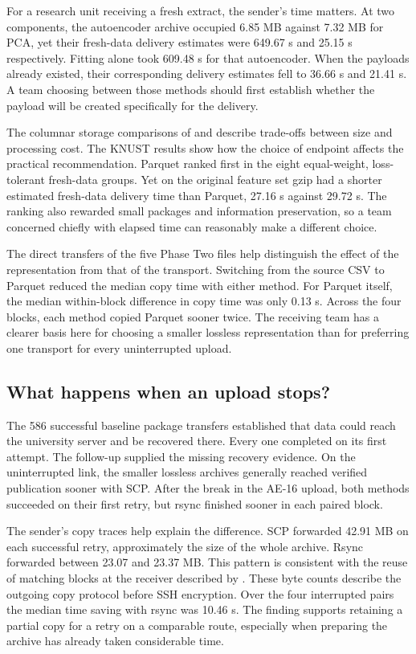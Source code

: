 For a research unit receiving a fresh extract, the sender's time matters. At two components, the autoencoder archive occupied 6.85 MB against 7.32 MB for PCA, yet their fresh-data delivery estimates were 649.67 s and 25.15 s respectively. Fitting alone took 609.48 s for that autoencoder. When the payloads already existed, their corresponding delivery estimates fell to 36.66 s and 21.41 s. A team choosing between those methods should first establish whether the payload will be created specifically for the delivery.

The columnar storage comparisons of \citet{Zeng2023} and \citet{Liu2025} describe trade-offs between size and processing cost. The KNUST results show how the choice of endpoint affects the practical recommendation. Parquet ranked first in the eight equal-weight, loss-tolerant fresh-data groups. Yet on the original feature set gzip had a shorter estimated fresh-data delivery time than Parquet, 27.16 s against 29.72 s. The ranking also rewarded small packages and information preservation, so a team concerned chiefly with elapsed time can reasonably make a different choice.

The direct transfers of the five Phase Two files help distinguish the effect of the representation from that of the transport. Switching from the source CSV to Parquet reduced the median copy time with either method. For Parquet itself, the median within-block difference in copy time was only 0.13 s. Across the four blocks, each method copied Parquet sooner twice. The receiving team has a clearer basis here for choosing a smaller lossless representation than for preferring one transport for every uninterrupted upload.

\subsection{What happens when an upload stops?}
The 586 successful baseline package transfers established that data could reach the university server and be recovered there. Every one completed on its first attempt. The follow-up supplied the missing recovery evidence. On the uninterrupted link, the smaller lossless archives generally reached verified publication sooner with SCP. After the break in the AE-16 upload, both methods succeeded on their first retry, but rsync finished sooner in each paired block.

The sender's copy traces help explain the difference. SCP forwarded 42.91 MB on each successful retry, approximately the size of the whole archive. Rsync forwarded between 23.07 and 23.37 MB. This pattern is consistent with the reuse of matching blocks at the receiver described by \citet{TridgellMackerras1996}. These byte counts describe the outgoing copy protocol before SSH encryption. Over the four interrupted pairs the median time saving with rsync was 10.46 s. The finding supports retaining a partial copy for a retry on a comparable route, especially when preparing the archive has already taken considerable time.

